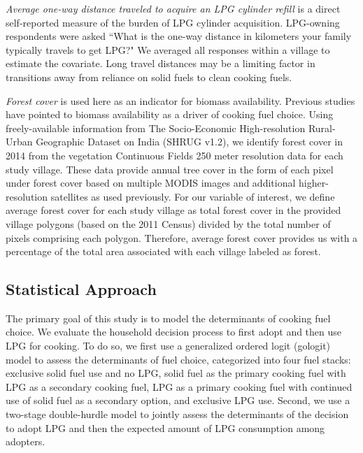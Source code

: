 \documentclass[11pt,english]{article}
\theoremstyle{plain} \newtheorem{claim}{Claim}
\theoremstyle{plain} \newtheorem{prop}{Proposition}
\theoremstyle{plain} \newtheorem{hypo}{Hypothesis}
\begin{document}
\textit{Average one-way distance traveled to acquire an LPG cylinder refill} is a direct self-reported measure of the burden of LPG cylinder acquisition. LPG-owning respondents were asked ``What is the one-way distance in kilometers your family typically travels to get LPG?" We averaged all responses within a village to estimate the covariate. Long travel distances may be a limiting factor in transitions away from reliance on solid fuels to clean cooking fuels\citep{Houetal2017}.

\textit{Forest cover} is used here as an indicator for biomass availability. Previous studies have pointed to biomass availability as a driver of cooking fuel choice\citep{Beheraetal2015,JaggerKittner2017,JaggerShively2014}. Using freely-available information from The Socio-Economic High-resolution Rural-Urban Geographic Dataset on India (SHRUG v1.2)\citep{Asheretal2019}, we identify forest cover in 2014 from the vegetation Continuous Fields 250 meter resolution data for each study village. These data provide annual tree cover in the form of each pixel under forest cover based on multiple MODIS images and additional higher-resolution satellites as used previously\citep{Asheretal2018}. For our variable of interest, we define average forest cover for each study village as total forest cover in the provided village polygons (based on the 2011 Census) divided by the total number of pixels comprising each polygon. Therefore, average forest cover provides us with a percentage of the total area associated with each village labeled as forest. 

\subsection*{Statistical Approach}

The primary goal of this study is to model the determinants of cooking fuel choice. We evaluate the household decision process to first adopt and then use LPG for cooking. To do so, we first use a generalized ordered logit (gologit) model to assess the determinants of fuel choice, categorized into four fuel stacks: exclusive solid fuel use and no LPG, solid fuel as the primary cooking fuel with LPG as a secondary cooking fuel, LPG as a primary cooking fuel with continued use of solid fuel as a secondary option, and exclusive LPG use. Second, we use a two-stage double-hurdle model to jointly assess the determinants of the decision to adopt LPG and then the expected amount of LPG consumption among adopters.
\end{document}

